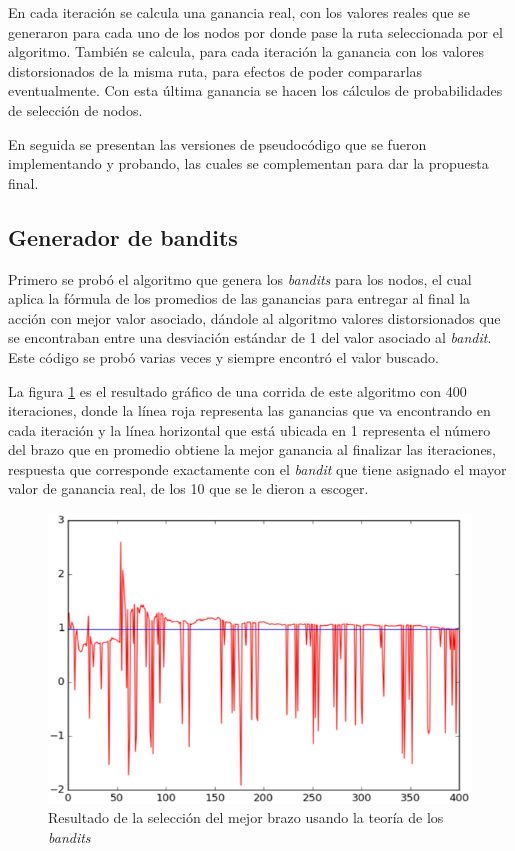 En cada iteración se calcula una ganancia real, con los valores reales que se generaron para cada uno de los nodos por donde pase la ruta seleccionada por el algoritmo. También se calcula, para cada iteración la ganancia con los valores distorsionados de la misma ruta, para efectos de poder compararlas eventualmente. Con esta última ganancia se hacen los cálculos de probabilidades de selección de nodos.


En seguida se presentan las versiones de pseudocódigo que se fueron implementando y probando, las cuales se complementan para dar la propuesta final.

\subsection{Generador de bandits}

Primero se probó el algoritmo que genera los \textit{bandits} para los nodos, el cual aplica la fórmula de los promedios de las ganancias para entregar al final la acción con mejor valor asociado, dándole al algoritmo valores distorsionados que se encontraban entre una desviación estándar de 1 del valor asociado al \textit{bandit}. Este código se probó varias veces y siempre encontró el valor buscado. 

La figura \ref{AlgBandit} es el resultado gráfico de una corrida de este algoritmo con 400 iteraciones, donde la línea roja representa las ganancias que va encontrando en cada iteración y la línea horizontal que está ubicada en 1 representa el número del brazo que en promedio obtiene la mejor ganancia al finalizar las iteraciones, respuesta que corresponde exactamente con el \textit{bandit} que tiene asignado el mayor valor de ganancia real, de los 10 que se le dieron a escoger.

\begin{figure} [H]
    \label{Resul2}
	\centering
	\includegraphics[scale=0.6]{AlgBandit}
	\caption[Resultado de la selección de brazo usando \textit{bandits}]{Resultado de la selección del mejor brazo usando la teoría de los \textit{bandits}}
	\label{AlgBandit}
\end{figure}

